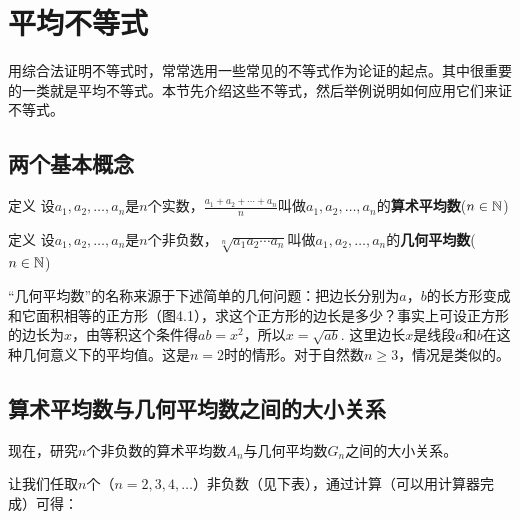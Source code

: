 \section{平均不等式}
用综合法证明不等式时，常常选用一些常见的不等式作为论证的起点。其中很重要的一类就是平均不等式。本节先介绍这些不等式，然后举例说明如何应用它们来证不等式。

\subsection{两个基本概念}

\begin{thm}
 {定义} 设$a_1,a_2,\ldots,a_n$是$n$个实数，$\frac{a_1+a_2+\cdots +a_n}{n}$叫做$a_1,a_2,\ldots,a_n$的\textbf{算术平均数}($n\in\mathbb{N}$)   
\end{thm}

\begin{thm}
{定义} 设$a_1,a_2,\ldots,a_n$是$n$个非负数，$\sqrt[n]{a_1a_2\cdots a_n}$叫做$a_1,a_2,\ldots,a_n$的\textbf{几何平均数}($n\in\mathbb{N}$)    
\end{thm}

“几何平均数”的名称来源于下述简单的几何问题：把边长分别为$a$，$b$的长方形变成和它面积相等的正方形（图4.1），求这个正方形的边长是多少？事实上可设正方形的边长为$x$，由等积这个条件得$ab=x^2$，所以$x=\sqrt{ab}$. 这里边长$x$是线段$a$和$b$在这种几何意义下的平均值。这是$n=2$时的情形。对于自然数$n\ge 3$，情况是类似的。
\begin{figure}[htp]
    \centering
{}
    \caption{}
\end{figure}

\subsection{算术平均数与几何平均数之间的大小关系}
现在，研究$n$个非负数的算术平均数$A_n$与几何平均数$G_n$之间的大小关系。

让我们任取$n$个（$n=2,3,4,\ldots$）非负数（见下表），通过计算（可以用计算器完成）可得：

